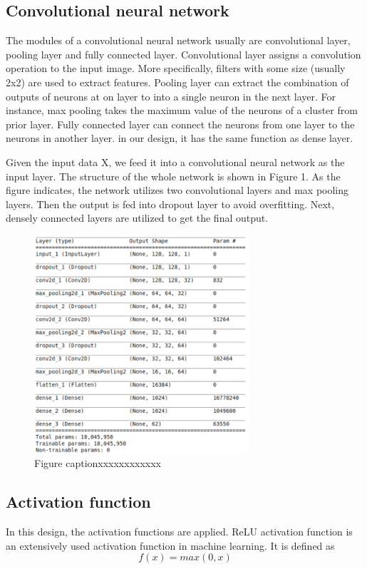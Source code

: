 \documentclass[twoside,twocolumn,10.8pt]{article}
\begin{document}
\subsection{Convolutional neural network}
The modules of a convolutional neural network usually are convolutional layer, pooling layer and fully connected layer. Convolutional layer assigns a convolution operation to the input image. More specifically, filters with some size (usually 2x2) are used to extract features. Pooling layer can extract the combination of outputs of neurons at on layer to into a single neuron in the next layer. For instance, max pooling takes the maximum value of the neurons of a cluster from prior layer. Fully connected layer can connect the neurons from one layer to the neurons in another layer. in our design, it has the same function as dense layer. 

\noindent Given the input data X, we feed it into a convolutional neural network as the input layer. The structure of the whole network is shown in Figure 1. As the figure indicates, the network utilizes two convolutional layers and max pooling layers. Then the output is fed into dropout layer to avoid overfitting. Next, densely connected layers are utilized to get the final output.

\begin{figure}[h]
\includegraphics[width=8cm]{results_exp.png}
\centering
\caption{Figure captionxxxxxxxxxxxx}\label{fig3}
\end{figure}


\subsection{Activation function}

In this design, the activation functions are applied. 
ReLU activation function is an extensively used activation function in machine learning. It is defined as 
\begin{equation}
\label{eq:1}
f(x) = max(0,x)
\end{equation}
\end{document}
